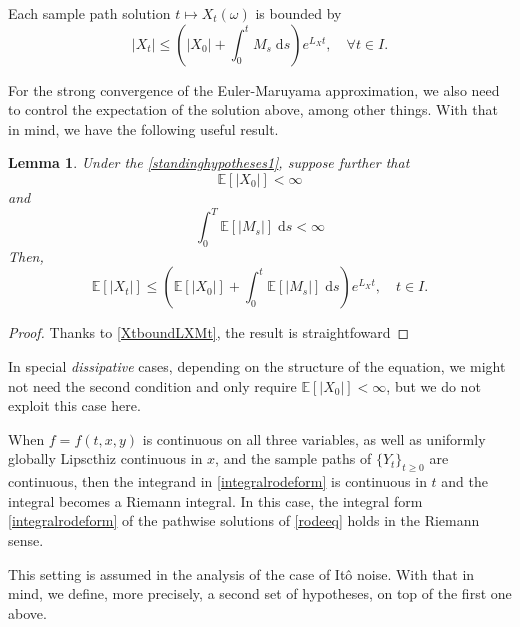 \documentclass[reqno,12pt]{amsart}
\theoremstyle{plain}%
\newtheorem{lem}{Lemma}[section]
\theoremstyle{definition}
\begin{document}
Each sample path solution $t \mapsto X_t(\omega)$ is bounded by
\begin{equation}
    \label{XtboundLXMt}
    |X_t| \leq \left(|X_0| + \int_0^t M_s\;\mathrm{d}s\right) e^{L_X t}, \quad \forall t\in I.
\end{equation}

For the strong convergence of the Euler-Maruyama approximation, we also need to control the expectation of the solution above, among other things. With that in mind, we have the following useful result.

\begin{lem}
    Under the \cref{standinghypotheses1}, suppose further that
    \begin{equation}
        \label{EX0strongbound}
        \mathbb{E}[|X_0|] < \infty
    \end{equation}
    and
    \begin{equation}
        \label{EMtstrongbound}
        \int_0^T \mathbb{E}[|M_s|] \;\mathrm{d}s < \infty
    \end{equation}
    Then,
    \begin{equation}
        \label{EXtstrongbound}
        \mathbb{E}[|X_t|] \leq \left(\mathbb{E}[|X_0|] + \int_0^t \mathbb{E}[|M_s|]\;\mathrm{d}s\right) e^{L_X t}, \quad t\in I.
    \end{equation}
\end{lem}

\begin{proof}
    Thanks to \eqref{XtboundLXMt}, the result is straightfoward
\end{proof}

In special \emph{dissipative} cases, depending on the structure of the equation, we might not need the second condition and only require $\mathbb{E}[|X_0|] < \infty$, but we do not exploit this case here.

When $f=f(t, x, y)$ is continuous on all three variables, as well as uniformly globally Lipscthiz continuous in $x$, and the sample paths of $\{Y_t\}_{t\geq 0}$ are continuous, then the integrand in \eqref{integralrodeform} is continuous in $t$ and the integral becomes a Riemann integral. In this case, the integral form \eqref{integralrodeform} of the pathwise solutions of \eqref{rodeeq} holds in the Riemann sense.

This setting is assumed in the analysis of the case of It\^o noise. With that in mind, we define, more precisely, a second set of hypotheses, on top of the first one above.
\end{document}
